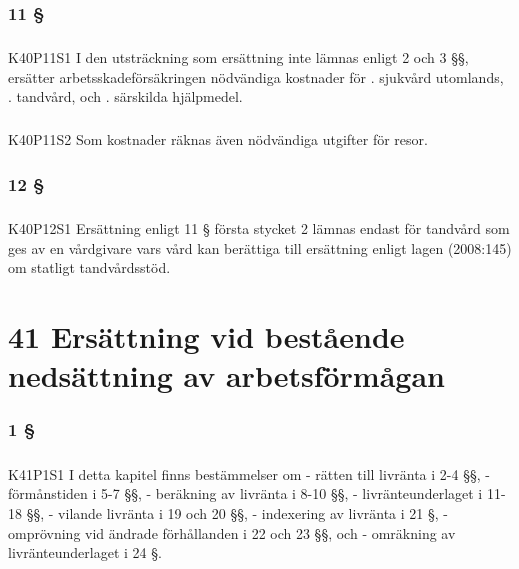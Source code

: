 \documentclass[a4paper,notitlepage,openany,10pt]{book}
\begin{document}
\subsection*{11 §}
\paragraph*{}
{\tiny K40P11S1}
I den utsträckning som ersättning inte lämnas enligt 2 och 3 §§, ersätter arbetsskadeförsäkringen nödvändiga kostnader för
. sjukvård utomlands,
. tandvård, och
. särskilda hjälpmedel.
\paragraph*{}
{\tiny K40P11S2}
Som kostnader räknas även nödvändiga utgifter för resor.
\subsection*{12 §}
\paragraph*{}
{\tiny K40P12S1}
Ersättning enligt 11 § första stycket 2 lämnas endast för tandvård som ges av en vårdgivare vars vård kan berättiga till ersättning enligt lagen (2008:145) om statligt tandvårdsstöd.
\chapter*{41 Ersättning vid bestående nedsättning av arbetsförmågan}
\subsection*{1 §}
\paragraph*{}
{\tiny K41P1S1}
I detta kapitel finns bestämmelser om
\newline - rätten till livränta i 2-4 §§,
\newline - förmånstiden i 5-7 §§,
\newline - beräkning av livränta i 8-10 §§,
\newline - livränteunderlaget i 11-18 §§,
\newline - vilande livränta i 19 och 20 §§,
\newline - indexering av livränta i 21 §,
\newline - omprövning vid ändrade förhållanden i 22 och 23 §§, och
\newline - omräkning av livränteunderlaget i 24 §.
\end{document}
